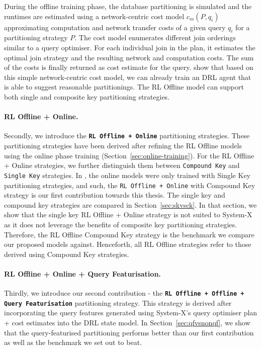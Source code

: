 During the offline training phase, the database partitioning is simulated and the runtimes are estimated using a network-centric cost model $c_m(P,q_i)$ approximating computation and network transfer costs of a given query $q_i$ for a partitioning strategy $P$. The cost model enumerates different join orderings similar to a query optimiser. For each individual join in the plan, it estimates the optimal join strategy and the resulting network and computation costs. The sum of the
costs is finally returned as cost estimate for the query. \citeauthor{DBLP:conf/sigmod/HilprechtBR20} show that based on this simple network-centric cost model, we can already train an DRL agent that is able to suggest reasonable partitionings. The RL Offline model can support both single and composite key partitioning strategies.

\noindent\paragraph{RL Offline + Online.} Secondly, we introduce the \textbf{\texttt{RL Offline + Online}} partitioning strategies. These partitioning strategies have been derived after refining the RL Offline models using the online phase training (Section~\ref{sec:online-training}). For the RL Offline + Online strategies, we further distinguish them between \texttt{Compound Key} and \texttt{Single Key} strategies. In \cite{DBLP:conf/sigmod/HilprechtBR20}, the online models were only trained with Single Key partitioning strategies, and such, the \texttt{RL Offline + Online} with Compound Key strategy is our first contribution towards this thesis. The single key and compound key strategies are compared in Section~\ref{sec:skvsck}. In that section, we show that the single key RL Offline + Online strategy is not suited to System-X as it does not leverage the benefits of composite key partitioning strategies. Therefore, the RL Offline Compound Key strategy is the benchmark we compare our proposed models against. Henceforth, all RL Offline strategies refer to those derived using Compound Key strategies. 

\noindent\paragraph{RL Offline + Online + Query Featurisation.} Thirdly, we introduce our second contribution - the \textbf{\texttt{RL Offline + Offline + Query Featurisation}} partitioning strategy. This strategy is derived after incorporating the query features generated using System-X's query optimiser plan + cost estimates into the DRL state model. In Section~\ref{sec:qfvsnonqf}, we show that the query-featurised partitioning performs better than our first contribution as well as the benchmark we set out to beat.

